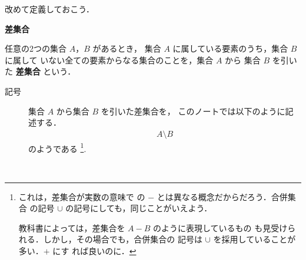                     改めて定義しておこう．
                    \\
                    \begin{itembox}[l]{\textbf{差集合}}
                        \begin{dfn}
                            任意の2つの集合 $A$，$B$ があるとき，
                            集合 $A$ に属している要素のうち，集合 $B$ に属して
                            いない全ての要素からなる集合のことを，集合 $A$ から
                            集合 $B$ を引いた \textbf{差集合} という．
                            \begin{description}
                                \item[記号]  集合 $A$ から集合 $B$ を引いた差集合を，
                                             このノートでは以下のように記述する．
                                                \begin{align}
                                                        A\setminus B
                                                \end{align}
                                             のようである
                                                \footnote{
                                                    これは，差集合が実数の意味で
                                                    の $-$ とは異なる概念だからだろう．合併集合
                                                    の記号 $\cup$ の記号にしても，同じことがいえよう．

                                                    教科書によっては，差集合を $A-B$ のように表現しているもの
                                                    も見受けられる．しかし，その場合でも，合併集合の
                                                    記号は $\cup$ を採用していることが多い．$+$ にす
                                                    れば良いのに．
                                                }.
                            \end{description}
                        \end{dfn}
                    \end{itembox}
                    \\
